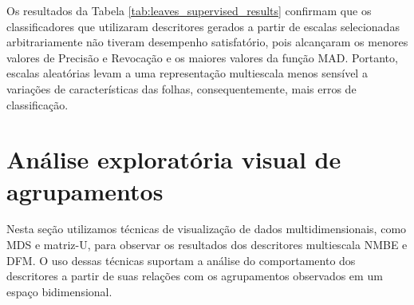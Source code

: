 Os resultados da Tabela \ref{tab:leaves_supervised_results} confirmam que os classificadores que utilizaram descritores gerados a partir de escalas selecionadas arbitrariamente não tiveram desempenho satisfatório, pois alcançaram os menores valores de Precisão e Revocação e os maiores valores da função \gls{MAD}. Portanto, escalas aleatórias levam a uma representação multiescala menos sensível a variações de características das folhas, consequentemente, mais erros de classificação. 

\section{Análise exploratória visual de agrupamentos}

Nesta seção utilizamos técnicas de visualização de dados multidimensionais, como \gls{MDS} e matriz-U, para observar os resultados dos descritores multiescala \gls{NMBE} e \gls{DFM}. O uso dessas técnicas suportam a análise do comportamento dos descritores a partir de suas relações com os agrupamentos observados em um espaço bidimensional. 



